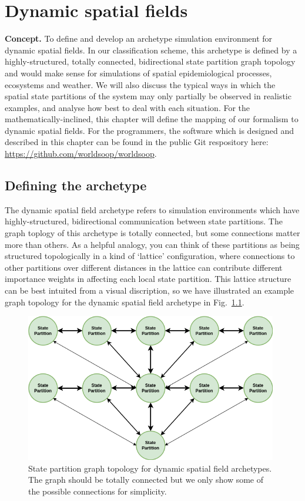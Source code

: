 \chapter{\sffamily Dynamic spatial fields}

{\bfseries\sffamily Concept.} To define and develop an archetype simulation environment for dynamic spatial fields. In our classification scheme, this archetype is defined by a highly-structured, totally connected, bidirectional state partition graph topology and would make sense for simulations of spatial epidemiological processes, ecosystems and weather. We will also discuss the typical ways in which the spatial state partitions of the system may only partially be observed in realistic examples, and analyse how best to deal with each situation. For the mathematically-inclined, this chapter will define the mapping of our formalism to dynamic spatial fields. For the programmers, the software which is designed and described in this chapter can be found in the public Git respository here: \href{https://github.com/worldsoop/worldsoop}{https://github.com/worldsoop/worldsoop}.


\section{\sffamily Defining the archetype}

The dynamic spatial field archetype refers to simulation environments which have highly-structured, bidirectional communication between state partitions. The graph toplogy of this archetype is totally connected, but some connections matter more than others. As a helpful analogy, you can think of these partitions as being structured topologically in a kind of `lattice' configuration, where connections to other partitions over different distances in the lattice can contribute different importance weights in affecting each local state partition. This lattice structure can be best intuited from a visual discription, so we have illustrated an example graph topology for the dynamic spatial field archetype in Fig.~\ref{fig:state-partition-graph-dynamic-spatial-fields}.

\begin{figure}[h]
\centering
\includegraphics[width=11cm]{images/chapter-7-state-partition-graph.drawio.png}
\caption{State partition graph topology for dynamic spatial field archetypes. The graph should be totally connected but we only show some of the possible connections for simplicity.}
\label{fig:state-partition-graph-dynamic-spatial-fields}
\end{figure}


